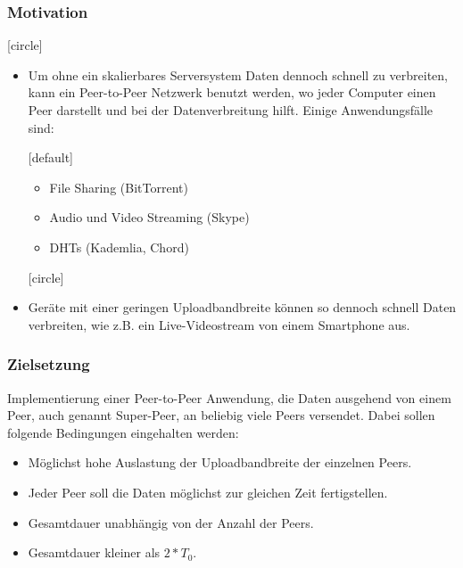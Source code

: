 \begin{frame}
  \frametitle{Motivation}

  [circle]
  \begin{itemize}
	  \item Um ohne ein skalierbares Serversystem Daten dennoch schnell zu verbreiten, kann ein Peer-to-Peer Netzwerk benutzt werden, wo jeder Computer einen Peer darstellt und bei der Datenverbreitung hilft. Einige Anwendungsfälle sind:

	  [default]
	  \begin{itemize}
	    \item File Sharing (BitTorrent)
	    \item Audio und Video Streaming (Skype)    
	    \item DHTs (Kademlia, Chord)
	  \end{itemize}

	  [circle]
	  \item Geräte mit einer geringen Uploadbandbreite können so dennoch schnell Daten verbreiten, wie z.B. ein Live-Videostream von einem Smartphone aus.
  \end{itemize}
\end{frame}


\begin{frame}
  \frametitle{Zielsetzung}

      Implementierung einer Peer-to-Peer Anwendung, die Daten ausgehend von einem Peer, auch genannt Super-Peer, an beliebig viele Peers versendet. Dabei sollen folgende Bedingungen eingehalten werden:

	  \begin{itemize}
	    \item Möglichst hohe Auslastung der Uploadbandbreite der einzelnen Peers.
	    \item Jeder Peer soll die Daten möglichst zur gleichen Zeit fertigstellen.
	    \item Gesamtdauer unabhängig von der Anzahl der Peers.
	    \item Gesamtdauer kleiner als $2 * T_0$.
	  \end{itemize}

\end{frame}





